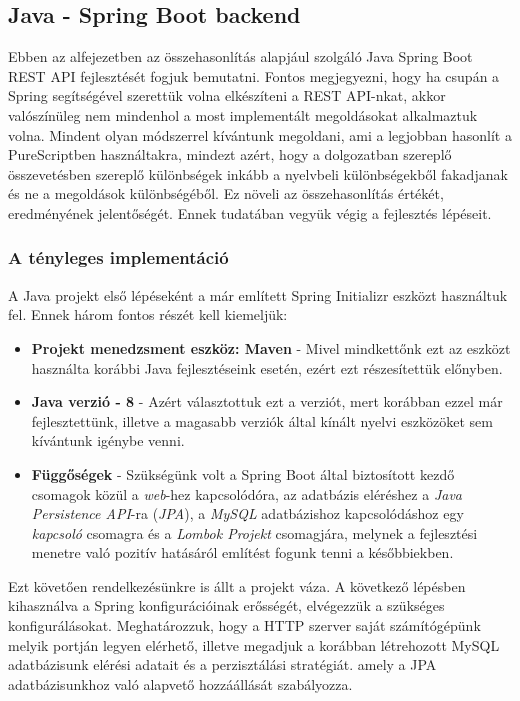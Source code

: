 \documentclass[12pt]{article}
\begin{document}
\subsection{Java - Spring Boot backend}

Ebben az alfejezetben az összehasonlítás alapjául szolgáló Java Spring Boot REST API fejlesztését fogjuk bemutatni. Fontos megjegyezni, hogy ha csupán a Spring segítségével szerettük volna elkészíteni a REST API-nkat, akkor valószínüleg nem mindenhol a most implementált megoldásokat alkalmaztuk volna. Mindent olyan módszerrel kívántunk megoldani, ami a legjobban hasonlít a PureScriptben használtakra, mindezt azért, hogy a dolgozatban szereplő összevetésben szereplő különbségek inkább a nyelvbeli különbségekből fakadjanak és ne a megoldások különbségéből. Ez növeli az összehasonlítás értékét, eredményének jelentőségét. Ennek tudatában vegyük végig a fejlesztés lépéseit.

\subsubsection{A tényleges implementáció}

A Java projekt első lépéseként a már említett Spring Initializr eszközt használtuk fel. Ennek három fontos részét kell kiemeljük:
\begin{itemize}
	\item[]\textbf{Projekt menedzsment eszköz: Maven}
	- Mivel mindkettőnk ezt az eszközt használta korábbi Java fejlesztéseink esetén, ezért ezt részesítettük előnyben.
	\item[]\textbf{Java verzió - 8}
	- Azért választottuk ezt a verziót, mert korábban ezzel már fejlesztettünk, illetve a magasabb verziók által kínált nyelvi eszközöket sem kívántunk igénybe venni.
	\item[]\textbf{Függőségek}
	- Szükségünk volt a Spring Boot által biztosított kezdő csomagok közül a \textit{web}-hez kapcsolódóra, az adatbázis eléréshez a \textit{Java Persistence API}-ra (\textit{JPA}), a \textit{MySQL} adatbázishoz kapcsolódáshoz egy \textit{kapcsoló} csomagra és a \textit{Lombok Projekt} csomagjára, melynek a fejlesztési menetre való pozitív hatásáról említést fogunk tenni a későbbiekben.
\end{itemize}

Ezt követően rendelkezésünkre is állt a projekt váza. A következő lépésben kihasználva a Spring konfigurációinak erősségét, elvégezzük a  szükséges konfigurálásokat. Meghatározzuk, hogy a HTTP szerver saját számítógépünk melyik portján legyen elérhető, illetve megadjuk a korábban létrehozott MySQL adatbázisunk elérési adatait és a perzisztálási stratégiát. amely a JPA adatbázisunkhoz való alapvető hozzáállását szabályozza.
\end{document}
